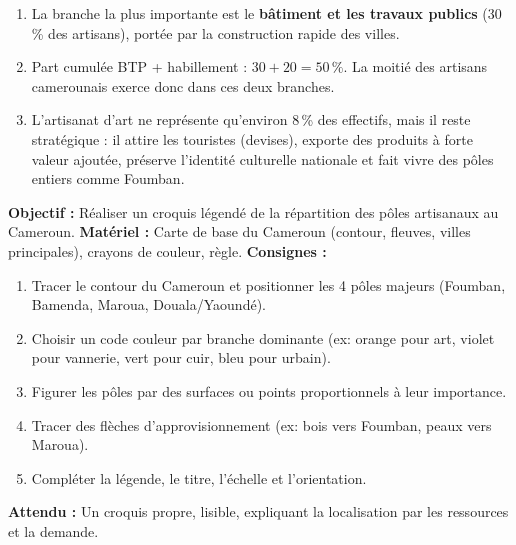 \documentclass[11pt]{article}
\begin{document}
\begin{corrige}
\begin{enumerate}
\item La branche la plus importante est le \textbf{bâtiment et les travaux publics} (30\,\% des artisans), portée par la construction rapide des villes.
\item Part cumulée BTP + habillement : $30 + 20 = 50\,\%$. La moitié des artisans camerounais exerce donc dans ces deux branches.
\item L'artisanat d'art ne représente qu'environ 8\,\% des effectifs, mais il reste stratégique : il attire les touristes (devises), exporte des produits à forte valeur ajoutée, préserve l'identité culturelle nationale et fait vivre des pôles entiers comme Foumban.
\end{enumerate}
\end{corrige}

\begin{experience}
\textbf{Objectif :} Réaliser un croquis légendé de la répartition des pôles artisanaux au Cameroun.
\textbf{Matériel :} Carte de base du Cameroun (contour, fleuves, villes principales), crayons de couleur, règle.
\textbf{Consignes :}
\begin{enumerate}
\item Tracer le contour du Cameroun et positionner les 4 pôles majeurs (Foumban, Bamenda, Maroua, Douala/Yaoundé).
\item Choisir un code couleur par branche dominante (ex: orange pour art, violet pour vannerie, vert pour cuir, bleu pour urbain).
\item Figurer les pôles par des surfaces ou points proportionnels à leur importance.
\item Tracer des flèches d'approvisionnement (ex: bois vers Foumban, peaux vers Maroua).
\item Compléter la légende, le titre, l'échelle et l'orientation.
\end{enumerate}
\textbf{Attendu :} Un croquis propre, lisible, expliquant la localisation par les ressources et la demande.
\end{experience}
\end{document}
